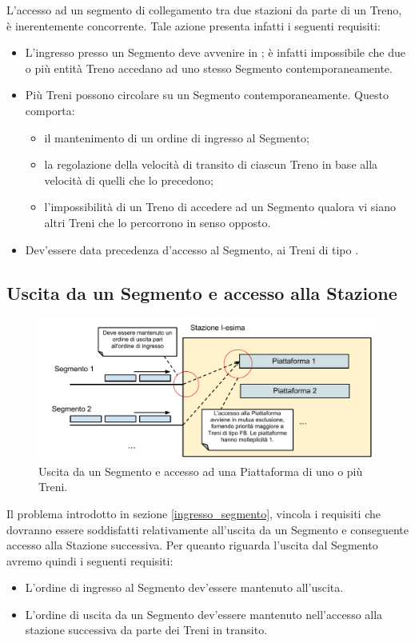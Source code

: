 	L'accesso ad un segmento di collegamento tra due stazioni da parte di un Treno, è inerentemente concorrente. Tale azione presenta infatti i seguenti requisiti:
		\begin{itemize}
			\item L'ingresso presso un Segmento deve avvenire in ; è infatti impossibile che due o più entità Treno accedano ad uno stesso Segmento contemporaneamente.
			\item Più Treni possono circolare su un Segmento contemporaneamente. Questo comporta:
				\begin{itemize}
					\item il mantenimento di un ordine di ingresso al Segmento;
					\item la regolazione della velocità di transito di ciascun Treno in base alla velocità di quelli che lo precedono;
					\item l'impossibilità di un Treno di accedere ad un Segmento qualora vi siano altri Treni che lo percorrono in senso opposto.
				\end{itemize}
			\item Dev'essere data precedenza d'accesso al Segmento, ai Treni di tipo .
		\end{itemize}


	\subsection{Uscita da un Segmento e accesso alla Stazione}

	\begin{figure}[htbp]
		\includegraphics[width=\textwidth,keepaspectratio]{imgs/Ingresso_Stazione.pdf}
		\caption{\footnotesize{Uscita da un Segmento e accesso ad una Piattaforma di uno o più Treni.}}
	\end{figure}

	Il problema introdotto in sezione \ref{ingresso_segmento}, vincola i requisiti che dovranno essere soddisfatti relativamente all'uscita da un Segmento e conseguente accesso alla Stazione successiva. Per queanto riguarda l'uscita dal Segmento avremo quindi i seguenti requisiti:
		\begin{itemize}
			\item L'ordine di ingresso al Segmento dev'essere mantenuto all'uscita. 
			\item L'ordine di uscita da un Segmento dev'essere mantenuto nell'accesso alla stazione successiva da parte dei Treni in transito.
		\end{itemize}

